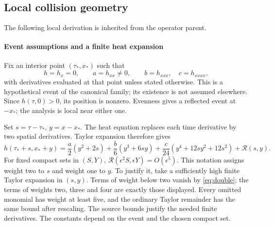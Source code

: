 \subsection{Local collision geometry}\label{sec:double}
The following local derivation is inherited from the operator parent\cite{OperatorCollision,GNPOperator}.

\paragraph{Event assumptions and a finite heat expansion}
Fix an interior point \((\tau_*,x_*)\) such that
\begin{equation}\label{eq:double}
 h=h_x=0,\qquad a=h_{xx}\ne0,
 \qquad b=h_{xxx},\quad c=h_{xxxx},
\end{equation}
with derivatives evaluated at that point unless stated otherwise.
This is a hypothetical event of the canonical family; its existence is
not assumed elsewhere. Since \(h(\tau,0)>0\), its position is nonzero.
Evenness gives a reflected event at \(-x_*\); the analysis is local
near either one.

Set \(s=\tau-\tau_*\), \(y=x-x_*\).
The heat equation replaces each time derivative by two spatial
derivatives. Taylor expansion therefore gives
\begin{equation}\label{eq:heat-four-jet}
 h(\tau_*+s,x_*+y)
 =\frac a2(y^2+2s)+\frac b6(y^3+6sy)
  +\frac c{24}(y^4+12sy^2+12s^2)+\mathcal R(s,y).
\end{equation}
For fixed compact sets in \((S,Y)\),
\(\mathcal R(\epsilon^2S,\epsilon Y)=O(\epsilon^5)\).
This notation assigns weight two to \(s\) and weight one to \(y\).
To justify it, take a sufficiently high finite Taylor expansion in
\((s,y)\). Terms of weight below two vanish by \eqref{eq:double};
the terms of weights two, three and four are exactly those displayed.
Every omitted monomial has weight at least five, and the ordinary
Taylor remainder has the same bound after rescaling. The source bounds
justify the needed finite derivatives. The constants depend on the event
and the chosen compact set.

